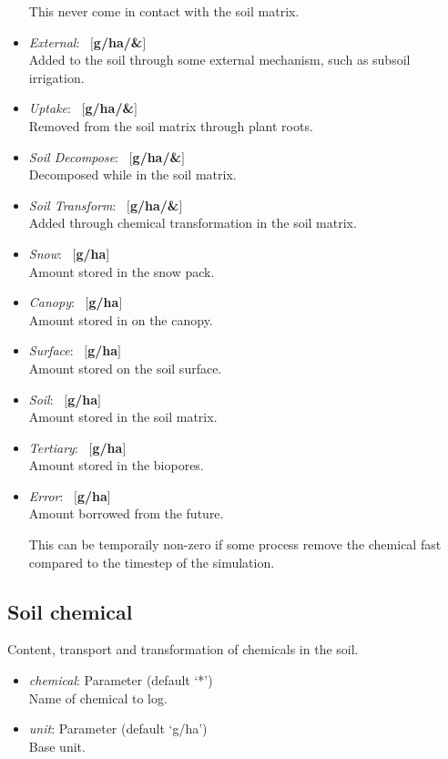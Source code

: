 \documentclass[a4paper]{article}
\begin{document}
\begin{itemize}
This never come in contact with the soil matrix.
\item \textit{External}: ~$[$\textbf{g/ha/\&}$]$\\
Added to the soil through some external mechanism, such as subsoil irrigation.
\item \textit{Uptake}: ~$[$\textbf{g/ha/\&}$]$\\
Removed from the soil matrix through plant roots.
\item \textit{Soil Decompose}: ~$[$\textbf{g/ha/\&}$]$\\
Decomposed while in the soil matrix.
\item \textit{Soil Transform}: ~$[$\textbf{g/ha/\&}$]$\\
Added through chemical transformation in the soil matrix.
\item \textit{Snow}: ~$[$\textbf{g/ha}$]$\\
Amount stored in the snow pack.
\item \textit{Canopy}: ~$[$\textbf{g/ha}$]$\\
Amount stored in on the canopy.
\item \textit{Surface}: ~$[$\textbf{g/ha}$]$\\
Amount stored on the soil surface.
\item \textit{Soil}: ~$[$\textbf{g/ha}$]$\\
Amount stored in the soil matrix.
\item \textit{Tertiary}: ~$[$\textbf{g/ha}$]$\\
Amount stored in the biopores.
\item \textit{Error}: ~$[$\textbf{g/ha}$]$\\
Amount borrowed from the future.

This can be temporaily non-zero if some process remove the
chemical fast compared to the timestep of the simulation.
\end{itemize}

\subsection{Soil chemical}
\label{model:log-Soil chemical}

Content, transport and transformation of chemicals in the soil.
\begin{itemize}
\item \textit{chemical}: Parameter (default `*')\\
Name of chemical to log.
\item \textit{unit}: Parameter (default `g/ha')\\
Base unit.
\end{itemize}
\end{document}
